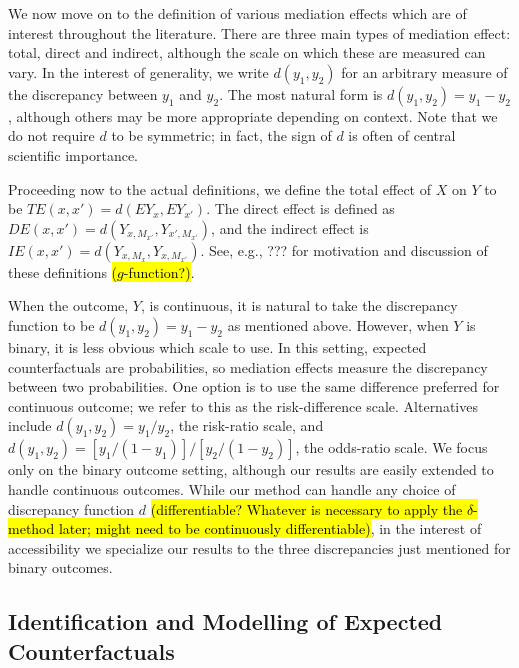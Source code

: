 \documentclass{article}
\begin{document}
We now move on to the definition of various mediation effects which are of interest throughout the literature. There are three main types of mediation effect: total, direct and indirect, although the scale on which these are measured can vary. In the interest of generality, we write $d(y_1, y_2)$ for an arbitrary measure of the discrepancy between $y_1$ and $y_2$. The most natural form is $d(y_1, y_2) = y_1 - y_2$, although others may be more appropriate depending on context. Note that we do not require $d$ to be symmetric; in fact, the sign of $d$ is often of central scientific importance.

Proceeding now to the actual definitions, we define the total effect of $X$ on $Y$ to be $TE(x, x') = d(EY_x, EY_{x'})$. The direct effect is defined as $DE(x, x') = d(Y_{x, M_{x'}}, Y_{x', M_{x'}})$, and the indirect effect is $IE(x, x') = d(Y_{x, M_{x}}, Y_{x, M_{x'}})$. See, e.g., ??? for motivation and discussion of these definitions \hl{($g$-function?)}.

When the outcome, $Y$, is continuous, it is natural to take the discrepancy function to be $d(y_1, y_2) = y_1 - y_2$ as mentioned above. However, when $Y$ is binary, it is less obvious which scale to use. In this setting, expected counterfactuals are probabilities, so mediation effects measure the discrepancy between two probabilities. One option is to use the same difference preferred for continuous outcome; we refer to this as the risk-difference scale. Alternatives include $d(y_1, y_2) = y_1 / y_2$, the risk-ratio scale, and $d(y_1, y_2) = [y_1 / (1 - y_1)] / [y_2 / (1 - y_2)]$, the odds-ratio scale. We focus only on the binary outcome setting, although our results are easily extended to handle continuous outcomes. While our method can handle any choice of discrepancy function $d$ \hl{(differentiable? Whatever is necessary to apply the $\delta$-method later; might need to be continuously differentiable)}, in the interest of accessibility we specialize our results to the three discrepancies just mentioned for binary outcomes.



\subsection{Identification and Modelling of Expected Counterfactuals}
\end{document}
